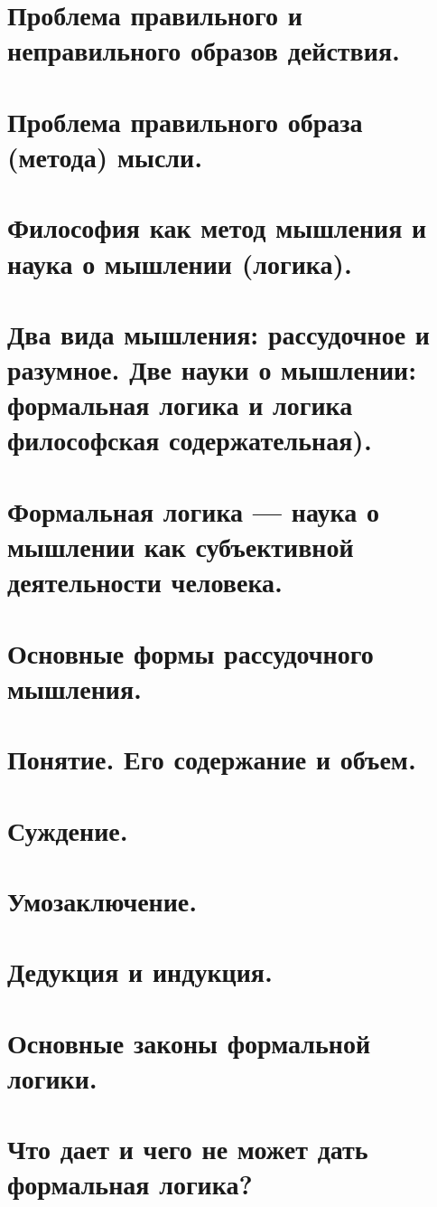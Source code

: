 \section{ Проблема правильного и неправильного образов действия.}
\section{ Проблема правильного образа (метода) мысли.}
\section{ Философия как метод мышления и наука о мышлении (логика).}
\section{ Два вида мышления: рассудочное и разумное. Две науки о мышлении: формальная логика и логика философская содержательная).}
\section{ Формальная логика — наука о мышлении как субъективной деятельности человека.}
\section{ Основные формы рассудочного мышления.}
\section{ Понятие. Его содержание и объем.}
\section{ Суждение.}
\section{ Умозаключение.}
\section{ Дедукция и индукция.}
\section{ Основные законы формальной логики.}
\section{ Что дает и чего не может дать формальная логика?}
